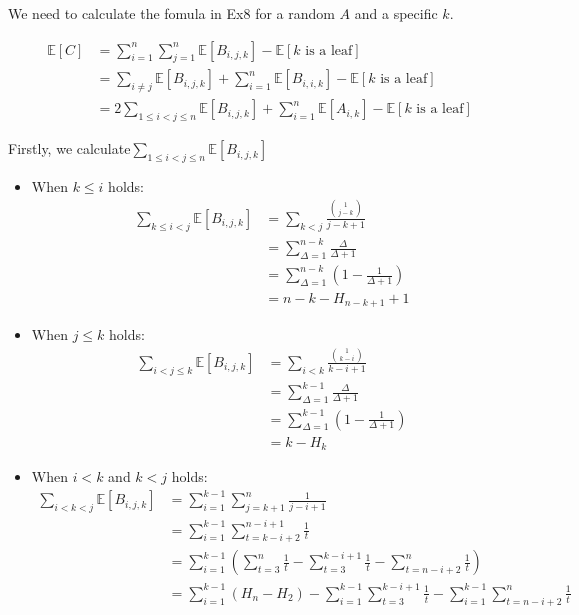         We need to calculate the fomula in Ex8 for a random $A$ and a specific $k$. 
		
		\begin{align*}
			\mathbb{E}[C]&= \sum_{i = 1}^{n}\sum_{j = 1}^{n} \mathbb{E}[B_{i,j,k}] - \mathbb{E}[k\text{~is~a~leaf}]\\
				&= \sum_{i \neq j} \mathbb{E}[B_{i,j,k}] + \sum_{i = 1}^{n} \mathbb{E}[B_{i,i,k}] - \mathbb{E}[k\text{~is~a~leaf}]\\
				&= 2\sum_{1 \leq i < j \leq n} \mathbb{E}[B_{i,j,k}] + \sum_{i = 1}^{n} \mathbb{E}[A_{i,k}] - \mathbb{E}[k\text{~is~a~leaf}]
		\end{align*}
		
		Firstly, we calculate$\displaystyle \sum_{1 \leq i < j \leq n} \mathbb{E}[B_{i,j,k}]$
        \begin{itemize}
        \item When $k\leq i$ holds:
        \begin{align*}
        \sum_{k\leq i<j}\mathbb{E}[B_{i,j,k}]&=\sum_{k<j}\frac{\binom{1}{j-k}}{j-k+1}\\
        &=\sum_{\Delta=1}^{n-k}\frac{\Delta}{\Delta+1}\\
        &=\sum_{\Delta=1}^{n-k}(1-\frac{1}{\Delta+1})\\
        &=n-k-H_{n-k+1}+1
        \end{align*}
        \item When $j\leq k$ holds:
        \begin{align*}
        \sum_{i<j\leq k}\mathbb{E}[B_{i,j,k}]&=\sum_{i<k}\frac{\binom{1}{k-i}}{k-i+1}\\
        &=\sum_{\Delta=1}^{k-1}\frac{\Delta}{\Delta+1}\\
        &=\sum_{\Delta=1}^{k-1}(1-\frac{1}{\Delta+1})\\
        &=k-H_{k}
        \end{align*}
        \item When $i<k$ and $k<j$ holds:
        \begin{align*}
        \sum_{i<k<j}\mathbb{E}[B_{i,j,k}] &= \sum_{i = 1}^{k - 1} \sum_{j = k + 1}^{n} \frac{1}{j - i + 1}\\
        &= \sum_{i = 1}^{k - 1} \sum_{t = k - i + 2}^{n - i + 1} \frac{1}{t}\\
        &= \sum_{i = 1}^{k - 1} (\sum_{t = 3}^{n} \frac{1}{t} - \sum_{t = 3}^{k - i + 1} \frac{1}{t} - \sum_{t = n - i + 2}^{n} \frac{1}{t})\\
        &= \sum_{i = 1}^{k - 1}(H_n - H_2) - \sum_{i = 1}^{k - 1} \sum_{t = 3}^{k - i + 1} \frac{1}{t} - \sum_{i = 1}^{k - 1} \sum_{t = n - i + 2}^{n} \frac{1}{t}\\

\end{align*}
\end{itemize}
